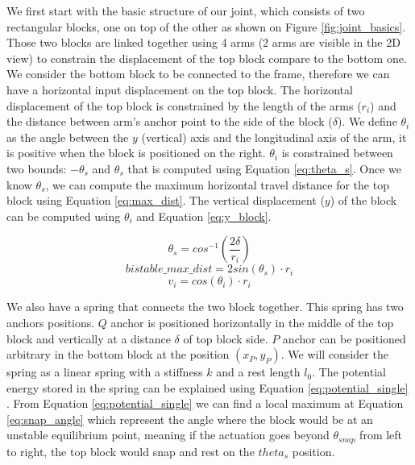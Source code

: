     We first start with the basic structure of our joint, which consists of two rectangular blocks, one on top of the other as shown on Figure \ref{fig:joint_basics}. Those two blocks are linked together using 4 arms (2 arms are visible in the 2D view) to constrain the displacement of the top block compare to the bottom one. We consider the bottom block to be connected to the frame, therefore we can have a horizontal input displacement on the top block. The horizontal displacement of the top block is constrained by the length of the arms ($r_i$) and the distance between arm's anchor point to the side of the block ($\delta$). We define $\theta_i$ as the angle between the $y$ (vertical) axis and the longitudinal axis of the arm, it is positive when the block is positioned on the right. $\theta_i$ is constrained between two bounds: $-\theta_s$ and $\theta_s$ that is computed using Equation \ref{eq:theta_s}. Once we know $\theta_s$, we can compute the maximum horizontal travel distance for the top block using Equation \ref{eq:max_dist}. The vertical displacement ($y$) of the block can be computed using $\theta_i$ and Equation \ref{eq:y_block}.
    
    \begin{equation}
        \theta_s = cos^{-1}\left(\frac{2\delta}{r_i}\right)
        \label{eq:theta_s}
    \end{equation}
    \begin{equation}
        bistable\_max\_dist = 2 sin(\theta_s) \cdot r_i
        \label{eq:max_dist}
    \end{equation}
    \begin{equation}
        v_i = cos(\theta_i) \cdot r_i
        \label{eq:y_block}
    \end{equation}
    
    We also have a spring that connects the two block together. This spring has two anchors positions. $Q$ anchor is positioned horizontally in the middle of the top block and vertically at a distance $\delta$ of top block side. $P$ anchor can be positioned arbitrary in the bottom block at the position $(x_P, y_P)$. We will consider the spring as a linear spring with a stiffness $k$ and a rest length $l_0$. The potential energy stored in the spring can be explained using Equation \ref{eq:potential_single} \cite{mo_main_paper}. From Equation \ref{eq:potential_single} we can find a local maximum at Equation \ref{eq:snap_angle} which represent the angle where the block would be at an unstable equilibrium point, meaning if the actuation goes beyond $\theta_{snap}$ from left to right, the top block would snap and rest on the $theta_s$ position. 
    
